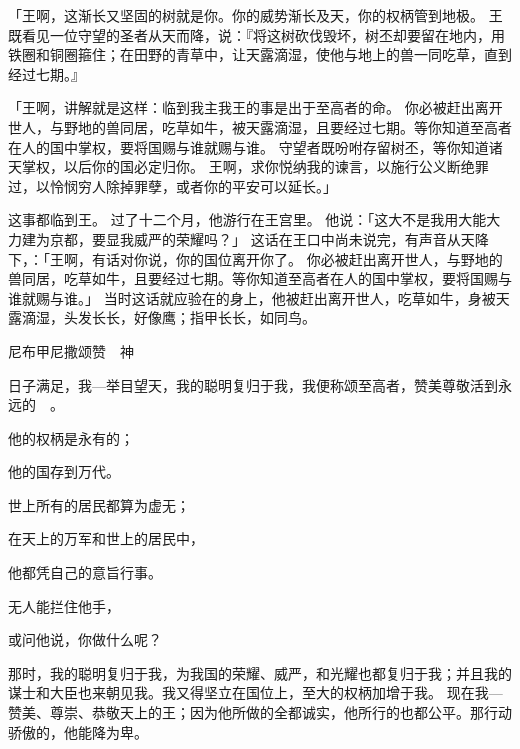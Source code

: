 {\par }{\PP {}「王啊，这渐长又坚固的树就是你。你的威势渐长及天，你的权柄管到地极。
王既看见一位守望的圣者从天而降，说：『将这树砍伐毁坏，树丕却要留在地内，用铁圈和铜圈箍住；在田野的青草中，让天露滴湿，使他与地上的兽一同吃草，直到经过七期。』
\par }{\PP {}「王啊，讲解就是这样：临到我主我王的事是出于至高者的命。
你必被赶出离开世人，与野地的兽同居，吃草如牛，被天露滴湿，且要经过七期。等你知道至高者在人的国中掌权，要将国赐与谁就赐与谁。
守望者既吩咐存留树丕，等你知道诸天掌权，以后你的国必定归你。
王啊，求你悦纳我的谏言，以施行公义断绝罪过，以怜悯穷人除掉罪孽，或者你的平安可以延长。」
\par }{\PP {}这事都临到{}王。
过了十二个月，他游行在{}王宫里。
他说：「这大{}不是我用大能大力建为京都，要显我威严的荣耀吗？」
这话在王口中尚未说完，有声音从天降下，{}：「{}王啊，有话对你说，你的国位离开你了。
你必被赶出离开世人，与野地的兽同居，吃草如牛，且要经过七期。等你知道至高者在人的国中掌权，要将国赐与谁就赐与谁。」
当时这话就应验在{}的身上，他被赶出离开世人，吃草如牛，身被天露滴湿，头发长长，好像鹰{}；指甲长长，如同鸟{}。
\par }{\SH 尼布甲尼撒颂赞　神
\par }{\PP {}日子满足，我—{}举目望天，我的聪明复归于我，我便称颂至高者，赞美尊敬活到永远的　{}。
\par }{\Q 他的权柄是永有的；
\par }{\Q 他的国存到万代。
\par }{\Q {}世上所有的居民都算为虚无；
\par }{\Q 在天上的万军和世上的居民中，
\par }{\Q 他都凭自己的意旨行事。
\par }{\Q 无人能拦住他手，
\par }{\Q 或问他说，你做什么呢？
\par }{\PP {}那时，我的聪明复归于我，为我国的荣耀、威严，和光耀也都复归于我；并且我的谋士和大臣也来朝见我。我又得坚立在国位上，至大的权柄加增于我。
现在我—{}赞美、尊崇、恭敬天上的王；因为他所做的全都诚实，他所行的也都公平。那行动骄傲的，他能降为卑。

}

